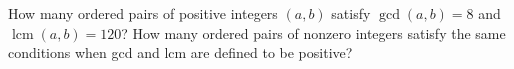 How many ordered pairs of positive integers $(a,b)$ satisfy $\gcd(a,b)=8$ and $\operatorname{lcm}(a,b)=120$? How many ordered pairs of nonzero integers satisfy the same conditions when gcd and lcm are defined to be positive?
